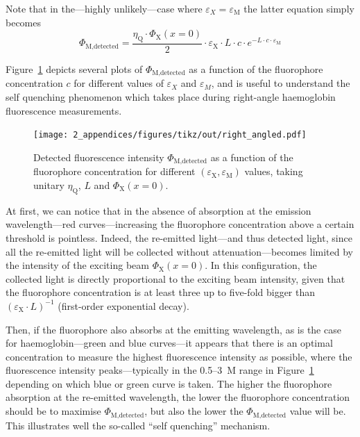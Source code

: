 Note that in the---highly unlikely---case where $\varepsilon_X = \varepsilon_\text{M}$ the latter equation simply becomes
\begin{equation}
	\Phi_\text{M,detected} = \frac{\eta_\text{Q} \cdot \Phi_\text{X}(x=0)}{2} \cdot \varepsilon_\text{X} \cdot L \cdot c \cdot e^{-L\cdot c \cdot \varepsilon_\text{M}}
\end{equation}


Figure~\ref{annfig:fluo_quenching:fluo_right_curves} depicts several plots of $\Phi_\text{M,detected}$ as a function of the fluorophore concentration $c$ for different values of $\varepsilon_X$ and $\varepsilon_M$, and is useful to understand the self quenching phenomenon which takes place during right-angle haemoglobin fluorescence measurements.

\begin{figure}
	\centering
	\texttt{[image: 2\_appendices/figures/tikz/out/right\_angled.pdf]}
	\caption[Detected fluorescence intensity in the right-angle optics case.]{Detected fluorescence intensity $\Phi_\text{M,detected}$ as a function of the fluorophore concentration for different $(\varepsilon_\text{X},\varepsilon_\text{M})$ values, taking unitary $\eta_\text{Q}$, $L$ and $\Phi_\text{X}(x=0)$.}
	\label{annfig:fluo_quenching:fluo_right_curves}
\end{figure}

At first, we can notice that in the absence of absorption at the emission wavelength---red curves---increasing the fluorophore concentration above a certain threshold is pointless. Indeed, the re-emitted light---and thus detected light, since all the re-emitted light will be collected without attenuation---becomes limited by the intensity of the exciting beam $\Phi_\text{X}(x=0)$. In this configuration, the collected light is directly proportional to the exciting beam intensity, given that the fluorophore concentration is at least three up to five-fold bigger than $(\varepsilon_\text{X} \cdot L)^{-1}$ (first-order exponential decay).

Then, if the fluorophore also absorbs at the emitting wavelength, as is the case for haemo\-globin---green and blue curves---it appears that there is an optimal concentration to measure the highest fluorescence intensity as possible, where the fluorescence intensity peaks---typically in the 0.5--3~M range in Figure~\ref{annfig:fluo_quenching:fluo_right_curves} depending on which blue or green curve is taken. The higher the fluorophore absorption at the re-emitted wavelength, the lower the fluorophore concentration should be to maximise $\Phi_\text{M,detected}$, but also the lower the $\Phi_\text{M,detected}$ value will be. This illustrates well the so-called \enquote{self quenching} mechanism.

